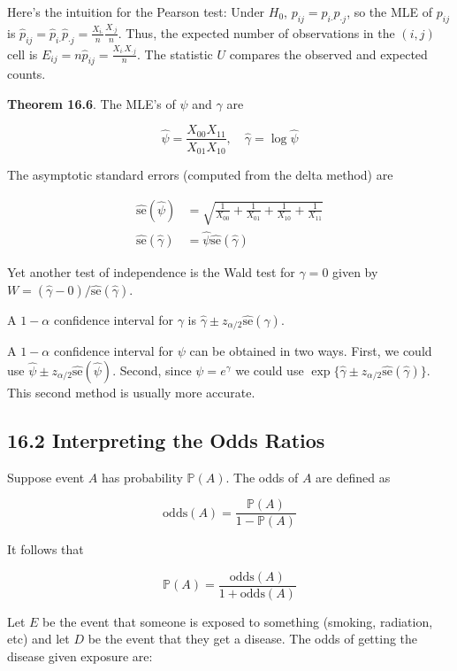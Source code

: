 Here's the intuition for the Pearson test: Under \(H_0\),
\(p_{ij} = p_{i\text{·}} p_{\text{·}j}\), so the MLE of \(p_{ij}\) is
\(\hat{p}_{ij} = \hat{p}_{i\text{·}} \hat{p}_{\text{·}j} = \frac{X_{i\text{·}}}{n} \frac{X_{\text{·}j}}{n}\).
Thus, the expected number of observations in the \((i, j)\) cell is
\(E_{ij} = n \hat{p}_{ij} = \frac{X_{i\text{·}} X_{\text{·}j}}{n}\). The
statistic \(U\) compares the observed and expected counts.

\textbf{Theorem 16.6}. The MLE's of \(\psi\) and \(\gamma\) are

\[
\hat{\psi} = \frac{X_{00} X_{11}}{X_{01} X_{10}}
, \quad
\hat{\gamma} = \log \hat{\psi}
\]

The asymptotic standard errors (computed from the delta method) are

\begin{align}
\hat{\text{se}}(\hat{\psi}) &= \sqrt{\frac{1}{X_{00}} + \frac{1}{X_{01}} + \frac{1}{X_{10}} + \frac{1}{X_{11}}}\\
\hat{\text{se}}(\hat{\gamma}) &= \hat{\psi} \hat{\text{se}}(\hat{\gamma})
\end{align}

Yet another test of independence is the Wald test for \(\gamma = 0\)
given by \(W = (\hat{\gamma} - 0) / \hat{\text{se}}(\hat{\gamma})\).

A \(1 - \alpha\) confidence interval for \(\gamma\) is
\(\hat{\gamma} \pm z_{\alpha/2} \hat{\text{se}}(\hat{\gamma})\).

A \(1 - \alpha\) confidence interval for \(\psi\) can be obtained in two
ways. First, we could use
\(\hat{\psi} \pm z_{\alpha/2} \hat{\text{se}}(\hat{\psi})\). Second,
since \(\psi = e^{\gamma}\) we could use
\(\exp \{\hat{\gamma} \pm z_{\alpha/2} \hat{\text{se}}(\hat{\gamma})\}\).
This second method is usually more accurate.

\subsection{16.2 Interpreting the Odds
Ratios}\label{interpreting-the-odds-ratios}

Suppose event \(A\) has probability \(\mathbb{P}(A)\). The odds of \(A\)
are defined as

\[\text{odds}(A) = \frac{\mathbb{P}(A)}{1 - \mathbb{P}(A)}\]

It follows that

\[\mathbb{P}(A) = \frac{\text{odds}(A)}{1 + \text{odds}(A)}\]

Let \(E\) be the event that someone is exposed to something (smoking,
radiation, etc) and let \(D\) be the event that they get a disease. The
odds of getting the disease given exposure are:

